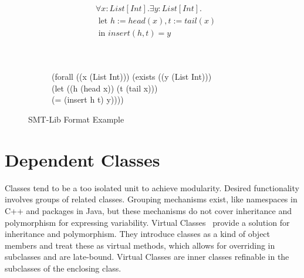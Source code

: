 \begin{figure}[t]
\begin{subfigure}{1\textwidth}
\begin{align*}
&\forall x: \mathit{List[Int]}. \exists y: \mathit{List[Int]}. \\
&\text{ let } h := head(x), t := tail(x)\\
&\text{ in } insert(h, t) = y
\end{align*}
\label{fig:smtlib-example-fo}
\end{subfigure}
\begin{subfigure}{1\textwidth}
\centering
\qquad\\\qquad\\
(forall ((x (List Int))) (exists ((y (List Int))) \\
(let ((h (head x)) (t (tail x))) \\
(= (insert h t) y))))
\label{fig:smtlib-example-smtlib}
\end{subfigure}
\caption{SMT-Lib Format Example}
\label{fig:smtlib-example}
\end{figure}

\section{Dependent Classes}
\label{sec:depcls}
Classes tend to be a too isolated unit to achieve modularity.
Desired functionality involves groups of related classes.
Grouping mechanisms exist, like namespaces in C++ and packages in Java,
but these mechanisms do not cover inheritance and polymorphism for expressing variability.
Virtual Classes~\cite{virtual:classes, vaidas:thesis} provide a solution for inheritance and polymorphism.
They introduce classes as a kind of object members and treat these as virtual methods,
which allows for overriding in subclasses and are late-bound.
Virtual Classes are inner classes refinable in the subclasses of the enclosing class. %

